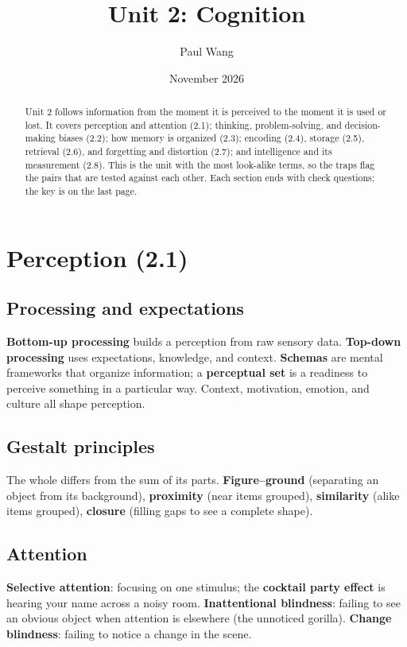\documentclass[11pt]{article}
\title{Unit 2: Cognition}
\author{Paul Wang}
\date{November 2026}
\begin{document}
\maketitle

\begin{abstract}
Unit 2 follows information from the moment it is perceived to the moment it is used or lost. It covers perception and attention (2.1); thinking, problem-solving, and decision-making biases (2.2); how memory is organized (2.3); encoding (2.4), storage (2.5), retrieval (2.6), and forgetting and distortion (2.7); and intelligence and its measurement (2.8). This is the unit with the most look-alike terms, so the traps flag the pairs that are tested against each other. Each section ends with check questions; the key is on the last page.
\end{abstract}


\section{Perception (2.1)}

\subsection{Processing and expectations}
\textbf{Bottom-up processing} builds a perception from raw sensory data. \textbf{Top-down processing} uses expectations, knowledge, and context. \textbf{Schemas} are mental frameworks that organize information; a \textbf{perceptual set} is a readiness to perceive something in a particular way. Context, motivation, emotion, and culture all shape perception.

\subsection{Gestalt principles}
The whole differs from the sum of its parts. \textbf{Figure--ground} (separating an object from its background), \textbf{proximity} (near items grouped), \textbf{similarity} (alike items grouped), \textbf{closure} (filling gaps to see a complete shape).

\subsection{Attention}
\textbf{Selective attention}: focusing on one stimulus; the \textbf{cocktail party effect} is hearing your name across a noisy room. \textbf{Inattentional blindness}: failing to see an obvious object when attention is elsewhere (the unnoticed gorilla). \textbf{Change blindness}: failing to notice a change in the scene.
\end{document}

